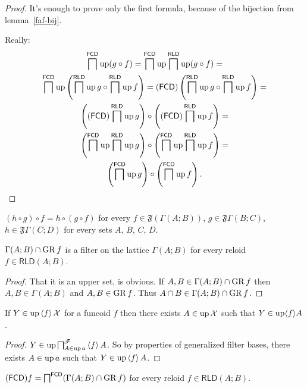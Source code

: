 \begin{proof}
It's enough to prove only the first formula, because of the bijection
from lemma~\ref{faf-bij}.

Really: 
\begin{multline*}
\bigsqcap^{\mathsf{FCD}}\operatorname{up}(g\circ f)=\bigsqcap^{\mathsf{FCD}}\operatorname{up}\bigsqcap^{\mathsf{RLD}}\operatorname{up}(g\circ f)=\\
\bigsqcap^{\mathsf{FCD}}\operatorname{up}\left(\bigsqcap^{\mathsf{RLD}}\operatorname{up} g\circ\bigsqcap^{\mathsf{RLD}}\operatorname{up} f\right)=(\mathsf{FCD})\left(\bigsqcap^{\mathsf{RLD}}\operatorname{up} g\circ\bigsqcap^{\mathsf{RLD}}\operatorname{up} f\right)=\\
\left((\mathsf{FCD})\bigsqcap^{\mathsf{RLD}}\operatorname{up} g\right)\circ\left((\mathsf{FCD})\bigsqcap^{\mathsf{RLD}}\operatorname{up} f\right)=\\
\left(\bigsqcap^{\mathsf{FCD}}\operatorname{up}\bigsqcap^{\mathsf{RLD}}\operatorname{up} g\right)\circ\left(\bigsqcap^{\mathsf{FCD}}\operatorname{up}\bigsqcap^{\mathsf{RLD}}\operatorname{up} f\right)=\\
\left(\bigsqcap^{\mathsf{FCD}}\operatorname{up} g\right)\circ\left(\bigsqcap^{\mathsf{FCD}}\operatorname{up} f\right).
\end{multline*}
\end{proof}
\begin{cor}
$(h\circ g)\circ f=h\circ(g\circ f)$ for every $f\in\mathfrak{F}(\Gamma(A;B))$,
$g\in\mathfrak{F}\Gamma(B;C)$, $h\in\mathfrak{F}\Gamma(C;D)$ for
every sets $A$, $B$, $C$, $D$.\end{cor}
\begin{lem}
$\Gamma(A;B)\cap\operatorname{GR} f$ is a filter on the lattice $\Gamma(A;B)$
for every reloid $f\in\mathsf{RLD}(A;B)$.\end{lem}
\begin{proof}
That it is an upper set, is obvious. If $A,B\in\Gamma(A;B)\cap\operatorname{GR} f$
then $A,B\in\Gamma(A;B)$ and $A,B\in\operatorname{GR} f$. Thus $A\cap B\in\Gamma(A;B)\cap\operatorname{GR} f$.\end{proof}
\begin{prop}
If $Y\in\operatorname{up}\left\langle f\right\rangle\mathcal{X}$ for a funcoid $f$ then there exists
$A\in\operatorname{up}\mathcal{X}$ such that $Y\in\operatorname{up}\langle f\rangle A$.\end{prop}
\begin{proof}
$Y\in\operatorname{up}\bigsqcap_{A\in\operatorname{up} a}^{\mathscr{F}}\left\langle f\right\rangle A$. So by properties
of generalized filter bases, there exists $A\in\operatorname{up} a$ such that $Y\in\operatorname{up}\left\langle f\right\rangle A$.\end{proof}
\begin{lem}
$(\mathsf{FCD}) f=\bigsqcap^{\mathsf{FCD}}(\Gamma(A;B)\cap\operatorname{GR} f)$ for every
reloid $f\in\mathsf{RLD}(A;B)$.\end{lem}

